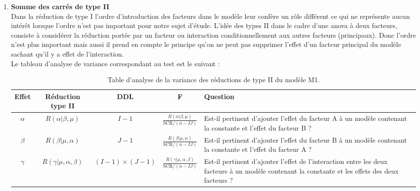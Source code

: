 \documentclass[12pt,a4paper]{report}
\begin{document}
\begin{enumerate}[label=\alph*)]
		\item \textbf{Somme des carrés de type II}\\
		Dans la réduction de type I l'ordre d'introduction des facteurs dans le modèle leur confère un rôle différent ce qui ne représente aucun intérêt lorsque l'ordre n'est pas important pour notre sujet d'étude. L'idée des types II dans le cadre d'une anova à deux facteurs, consiste à considérer la réduction portée par un facteur ou interaction conditionnellement aux autres facteurs (principaux). Donc l'ordre n'est plus important mais aussi il prend en compte le principe qu'on ne peut pas supprimer l'effet d'un facteur principal du modèle sachant qu'il y a effet de l'interaction.\\
		Le tableau d'analyse de variance correspondant au test est le suivant : 
		\begin{table}[H]
			\centering
			\begin{adjustbox}{width=\textwidth}
				\begin{tabular}{|c|c|c|c|p{8cm}|}
					\hline
					\textbf{Effet} & \textbf{Réduction type II} & \textbf{DDL} & \textbf{F} & \textbf{Question} \\ \hline
					$\alpha$ & $R(\alpha|\beta, \mu)$ & $I-1$ & $\frac{R(\alpha|\beta, \mu)}{\text{SCR} / (n - IJ)}$ & Est-il pertinent d'ajouter l'effet du facteur A à un modèle contenant la constante et l'effet du facteur B ? \\ \hline
					$\beta$ & $R(\beta|\mu, \alpha)$ & $J-1$ & $\frac{R(\beta|\mu, \alpha)}{\text{SCR} / (n - IJ)}$ & Est-il pertinent d'ajouter l'effet du facteur B à un modèle contenant la constante et l'effet du facteur A ? \\ \hline
					$\gamma$ & $R(\gamma|\mu, \alpha, \beta)$ & $(I-1) \times (J-1)$ & $\frac{R(\gamma|\mu, \alpha, \beta)}{\text{SCR} / (n - IJ)}$ & Est-il pertinent d'ajouter l'effet de l'interaction entre les deux facteurs à un modèle contenant la constante et les effets des deux facteurs ? \\ \hline
				\end{tabular}
			\end{adjustbox}
			\caption{Table d'analyse de la variance des réductions de type II du modèle M1.}
		\end{table}
		

\end{enumerate}
\end{document}
